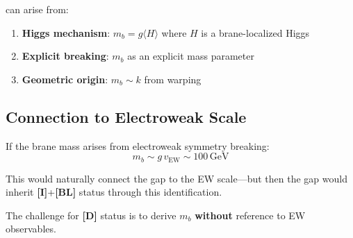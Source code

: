 \documentclass[11pt,a4paper]{article}
\newcommand{\mb}{m_b}
\newcommand{\GeV}{\,\mathrm{GeV}}
\newcommand{\tagD}{\textbf{[D]}}
\newcommand{\tagI}{\textbf{[I]}}
\newcommand{\tagBL}{\textbf{[BL]}}
\theoremstyle{definition}
\theoremstyle{plain}
\theoremstyle{remark}
\begin{document}
can arise from:
\begin{enumerate}
\item \textbf{Higgs mechanism}: $\mb = g\langle H \rangle$ where $H$ is a brane-localized Higgs
\item \textbf{Explicit breaking}: $\mb$ as an explicit mass parameter
\item \textbf{Geometric origin}: $\mb \sim k$ from warping
\end{enumerate}

\subsection{Connection to Electroweak Scale}

If the brane mass arises from electroweak symmetry breaking:
\begin{equation}
\mb \sim g\, v_{\mathrm{EW}} \sim 100\GeV
\label{eq:ew-connection}
\end{equation}

This would naturally connect the gap to the EW scale---but then the gap
would inherit \tagI{}+\tagBL{} status through this identification.

The challenge for \tagD{} status is to derive $\mb$ \textbf{without}
reference to EW observables.

\end{document}
